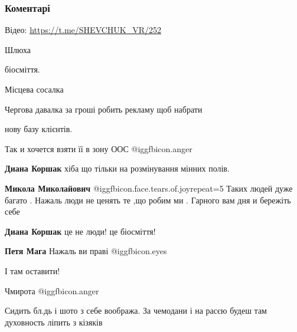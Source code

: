  
 
 
 
 
\subsubsection{Коментарі}

\begin{itemize} %
Відео: \url{https://t.me/SHEVCHUK_VR/252}


Шлюха

біосміття.

Місцева сосалка

Чергова давалка за гроші робить рекламу щоб набрати \par нову базу клієнтів.

Так и хочется взяти її в зону ООС  @igg{fbicon.anger} 


\begin{itemize} %
\textbf{Диана Коршак} хіба що тільки на розмінування мінних полів.

\textbf{Микола Миколайович}  @igg{fbicon.face.tears.of.joy}{repeat=5} Таких людей дуже багато .
Нажаль люди не ценять те ,що робим ми .
Гарного вам дня и бережіть себе

\textbf{Диана Коршак} це не люди! це біосміття!

\textbf{Петя Мага} Нажаль ви праві  @igg{fbicon.eyes} 

І там оставити!
\end{itemize} %


Чмирота  @igg{fbicon.anger} 

Сидить бл.дь і шото з себе вообража. За чемодани і на расєю будеш там духовность ліпить з кізяків


\end{itemize}
